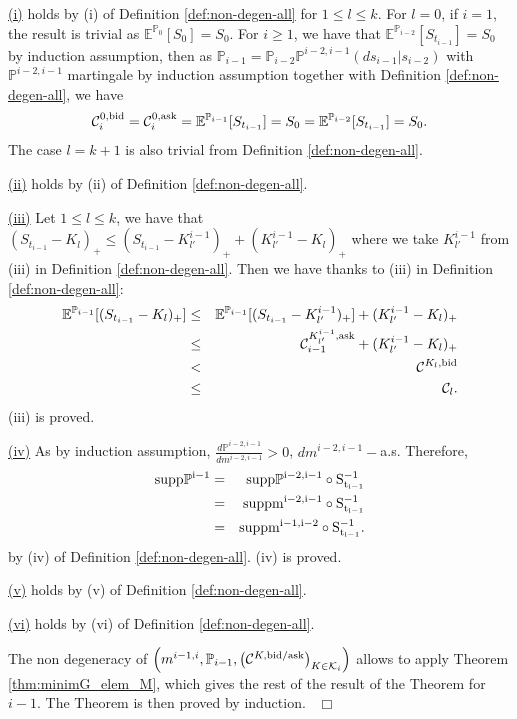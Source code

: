 \documentclass{amsart}%
\def \E{\mathbb{E}}
\def \P{{\mathbb P}}
\def\Cc{{\cal C}}
\def\Kc{{\cal K}}
\def\no{\noindent}
\def \ep{\hbox{ }\hfill{ ${\cal t}$~\hspace{-5.1mm}~${\cal u}$   } }
\def \ep{\hbox{ }\hfill$\Box$}
\theoremstyle{definition}
\theoremstyle{remark}
\newcommand{\beaa}{\begin{eqnarray*}}
\newcommand{\eeaa}{\end{eqnarray*}}
\newcommand{\cal}{\mathcal}
\begin{document}
\no\underline{\rm (i)} holds by {\rm (i)} of Definition \ref{def:non-degen-all} for $1 \le l\le k$. For $l=0$, if $i=1$, the result is trivial as $\E^{\P_0}[S_0] = S_0$. For $i\ge 1$, we have that $\E^{\P_{i-2}}[S_{t_{i-1}}] = S_0$ by induction assumption, then as $\P_{i-1} = \P_{i-2}\P^{i-2,i-1}(ds_{i-1}|s_{i-2})$ with $\P^{i-2,i-1}$ martingale by induction assumption together with Definition \ref{def:non-degen-all}, we have
\beaa 
\Cc^{0,{\rm bid}}_i = \Cc^{0,{\rm ask}}_i = \E^{\P_{i-1}}[S_{t_{i-1}}] = S_0  = \E^{\P_{i-2}}[S_{t_{i-1}}] = S_0.
\eeaa 
The case $l=k+1$ is also trivial from Definition \ref{def:non-degen-all}.


\no\underline{\rm (ii)} holds by {\rm (ii)} of Definition \ref{def:non-degen-all}.


\no\underline{\rm (iii)} Let $1\le l\le k$, we have that $(S_{t_{i-1}}-K_l)_+\le (S_{t_{i-1}}-K^{i-1}_{l'})_++(K^{i-1}_{l'}-K_{l})_+$ where we take $K^{i-1}_{l'}$ from \rm{(iii)} in Definition \ref{def:non-degen-all}. Then we have thanks to \rm{(iii)} in Definition \ref{def:non-degen-all}:
\beaa 
\E^{\P_{i-1}}[(S_{t_{i-1}}-K_l)_+] &\le& \E^{\P_{i-1}}[(S_{t_{i-1}}-K^{i-1}_{l'})_+]+(K^{i-1}_{l'}-K_{l})_+\\
&\le & \Cc^{K^{i-1}_{l'},\rm ask}_{i-1}+(K^{i-1}_{l'}-K_{l})_+\\
&< & \Cc^{K_l,\rm bid}\\
&\le & \Cc_l.
\eeaa 
\rm (iii) is proved.


\no\underline{\rm (iv)} As by induction assumption, $\frac{d\P^{i-2,i-1}}{dm^{i-2,i-1}}>0$, $dm^{i-2,i-1}-$a.s. Therefore,
\beaa 
{\rm supp \P^{i-1}}&=&{\rm supp \P^{i-2,i-1}\circ S_{t_{i-1}}^{-1}}\\
&=& {\rm supp m^{i-2,i-1}\circ S_{t_{i-1}}^{-1}}\\
&=&{\rm supp m^{i-1,i-2}\circ S_{t_{i-1}}^{-1}}.
\eeaa 
by \rm{(iv)} of Definition \ref{def:non-degen-all}. \rm{(iv)} is proved.


\no\underline{\rm (v)} holds by {\rm (v)} of Definition \ref{def:non-degen-all}.


\no\underline{\rm (vi)} holds by {\rm (vi)} of Definition \ref{def:non-degen-all}.


The non degeneracy of $\left(m^{i-1,i}, \P_{i-1}, \left(\Cc^{K,{\rm bid/ask}}\right)_{K\in\Kc_{i}}\right)$ allows to apply Theorem \ref{thm:minimG_elem_M}, which gives the rest of the result of the Theorem for $i-1$. The Theorem is then proved by induction.
\ep



\newpage


\end{document}

